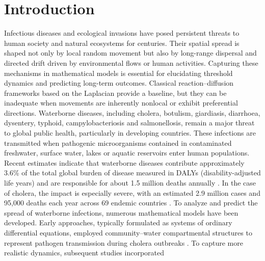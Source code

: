 \documentclass[a4paper,11pt]{amsart}
\theoremstyle{definition}
\numberwithin{equation}{section}
\theoremstyle{definition}
\begin{document}







\tableofcontents


\section{ Introduction}


Infectious diseases and ecological invasions have posed persistent threats to human society and natural ecosystems for centuries. Their spatial spread is shaped not only by local random movement but also by long-range dispersal and directed drift driven by environmental flows or human activities. Capturing these mechanisms in mathematical models is essential for elucidating threshold dynamics and predicting long-term outcomes. Classical reaction–diffusion frameworks based on the Laplacian provide a baseline, but they can be inadequate when movements are inherently nonlocal or exhibit preferential directions. Waterborne diseases, including cholera, botulism, giardiasis, diarrhoea, dysentery,
typhoid, campylobacteriosis and salmonellosis, remain a major threat to global public health,
particularly in developing countries. These infections are transmitted when pathogenic
microorganisms contained in contaminated freshwater, surface water, lakes or aquatic reservoirs
enter human populations. Recent estimates indicate that waterborne diseases contribute approximately
3.6\% of the total global burden of disease measured in DALYs (disability-adjusted life years) and are
responsible for about 1.5 million deaths annually \cite{Weiss2016}. In the case of cholera, the impact
is especially severe, with an estimated 2.9 million cases and 95,000 deaths each year across
69 endemic countries \cite{Ali2015}. To analyze and predict the spread of waterborne infections, numerous mathematical
models have been developed. Early approaches, typically formulated as systems of
ordinary differential equations, employed community--water compartmental structures
to represent pathogen transmission during cholera outbreaks
\cite{Wang2015, Andrews2011, Codeco2001, Hartley2006, Mukandavire2011,
Tien2010, Bertuzzo2011, Eisenberg2013, Wang2015, Pascual2017,
Mukandavire2013, Chao2011, Bertuzzo2017, Tien2011, Eisenberg2016, Tuite2011, King_2018}. To capture more realistic dynamics, subsequent studies incorporated
\end{document}
